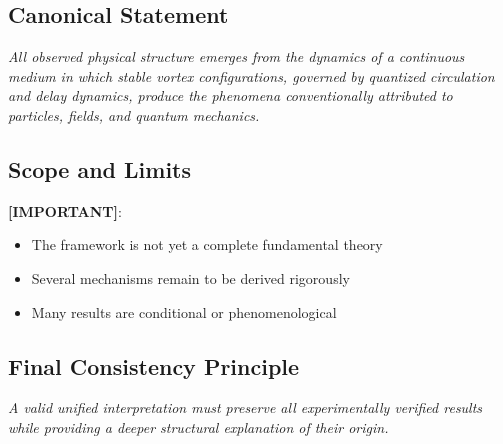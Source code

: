     \subsection{Canonical Statement}
        
        \begin{center}
            \textit{
                All observed physical structure emerges from the dynamics of a continuous medium in which stable vortex configurations, governed by quantized circulation and delay dynamics, produce the phenomena conventionally attributed to particles, fields, and quantum mechanics.
            }
        \end{center}
    
    \subsection{Scope and Limits}
        
        \textbf{[IMPORTANT]}:
        
        \begin{itemize}
            \item The framework is not yet a complete fundamental theory
            \item Several mechanisms remain to be derived rigorously
            \item Many results are conditional or phenomenological
        \end{itemize}
    
    \subsection{Final Consistency Principle}
        
        \begin{center}
            \textit{
                A valid unified interpretation must preserve all experimentally verified results while providing a deeper structural explanation of their origin.
            }
        \end{center}